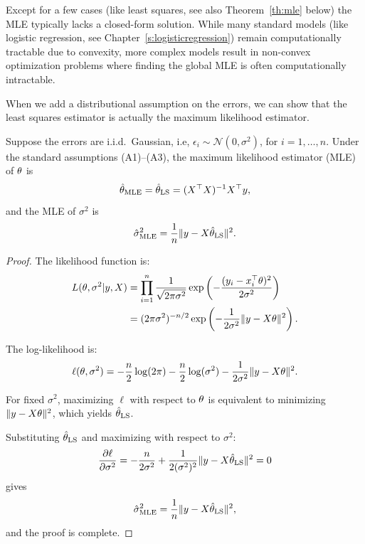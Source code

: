 Except for a few cases (like least squares, see also Theorem~\ref{th:mle} below) the MLE typically lacks a closed-form solution. While many standard models (like logistic regression, see Chapter~\ref{s:logisticregression}) remain computationally tractable due to convexity, more complex models result in non-convex optimization problems where finding the global MLE is often computationally intractable.





When we add a distributional assumption on the errors, we can show that
the least squares estimator is actually the maximum likelihood estimator.

\begin{theorem}\label{th:mle}
Suppose the errors are i.i.d.\ Gaussian, i.e,
$\epsilon_i \sim \mathcal{N}(0, \sigma^2)$, for $i = 1, \ldots, n$. Under the standard assumptions (A1)--(A3), the maximum likelihood 
estimator (MLE) of $\theta$ is
$$\hat{\theta}_{\text{MLE}} = \hat{\theta}_{\text{LS}} = (X^\top X)^{-1}X^\top y,$$
and the MLE of $\sigma^2$ is
$$\hat{\sigma}^2_{\text{MLE}} = \frac{1}{n}\|y - X\hat{\theta}_{\text{LS}}\|^2.$$
\end{theorem}

\begin{proof}
The likelihood function is:
\begin{align*}
  L(\theta, \sigma^2 | y, X)
  &= \prod_{i=1}^n \frac{1}{\sqrt{2\pi\sigma^2}}\exp\left(-\frac{(y_i - x_i^\top\theta)^2}{2\sigma^2}\right)\\
  &= (2\pi\sigma^2)^{-n/2}\exp\left(-\frac{1}{2\sigma^2}\|y - X\theta\|^2\right).
\end{align*}

The log-likelihood is:
$$\ell(\theta, \sigma^2) = -\frac{n}{2}\log(2\pi) - \frac{n}{2}\log(\sigma^2) - \frac{1}{2\sigma^2}\|y - X\theta\|^2.$$

For fixed $\sigma^2$, maximizing $\ell$ with respect to $\theta$ is equivalent to 
minimizing $\|y - X\theta\|^2$, which yields $\hat{\theta}_{\text{LS}}$.

Substituting $\hat{\theta}_{\text{LS}}$ and maximizing with respect to $\sigma^2$:
$$\frac{\partial\ell}{\partial\sigma^2} = -\frac{n}{2\sigma^2} + \frac{1}{2(\sigma^2)^2}\|y - X\hat{\theta}_{\text{LS}}\|^2 = 0$$
gives
\begin{equation}\label{eq:biasedMSE}
\hat{\sigma}^2_{\text{MLE}} = \frac{1}{n}\|y - X\hat{\theta}_{\text{LS}}\|^2,
\end{equation}
and the proof is complete.


\end{proof}

